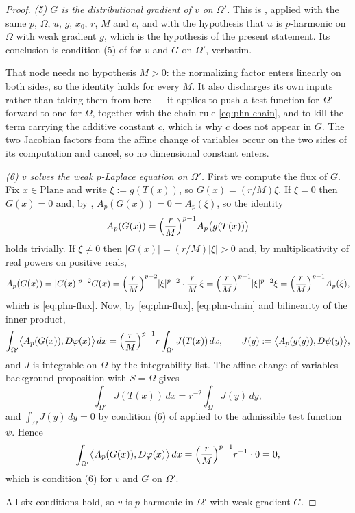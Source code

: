 \begin{proof}
\medskip\noindent\emph{(5) $G$ is the distributional gradient of $v$ on $\Omega'$.}
This is , applied with the same $p$, $\Omega$, $u$, $g$, $x_0$,
$r$, $M$ and $c$, and with the hypothesis that $u$ is $p$-harmonic on $\Omega$ with weak
gradient $g$, which is the hypothesis of the present statement.  Its conclusion is condition
(5) of  for $v$ and $G$ on $\Omega'$, verbatim.

That node needs no hypothesis $M>0$: the normalizing factor enters linearly on both sides, so
the identity holds for every $M$.  It also discharges its own inputs rather than taking them
from here --- it applies  to push a test function for
$\Omega'$ forward to one for $\Omega$, together with the chain rule \eqref{eq:phn-chain}, and
 to kill the term carrying the additive constant $c$,
which is why $c$ does not appear in $G$.  The two Jacobian factors from the affine change of
variables occur on the two sides of its computation and cancel, so no dimensional constant
enters.

\medskip\noindent\emph{(6) $v$ solves the weak $p$-Laplace equation on $\Omega'$.}
First we compute the flux of $G$.  Fix $x\in\mathrm{Plane}$ and write $\xi:=g(T(x))$, so
$G(x)=(r/M)\xi$.  If $\xi=0$ then $G(x)=0$ and, by , $A_p(G(x))=0=A_p(\xi)$,
so the identity
\begin{equation}\label{eq:phn-flux}
  A_p(G(x))=\Bigl(\frac rM\Bigr)^{p-1}A_p\bigl(g(T(x))\bigr)
\end{equation}
holds trivially.  If $\xi\neq0$ then $\lvert G(x)\rvert=(r/M)\lvert\xi\rvert>0$ and, by
multiplicativity of real powers on positive reals,
\[
  A_p(G(x))
  =\lvert G(x)\rvert^{p-2}G(x)
  =\Bigl(\frac rM\Bigr)^{p-2}\lvert\xi\rvert^{p-2}\cdot\frac rM\,\xi
  =\Bigl(\frac rM\Bigr)^{p-1}\lvert\xi\rvert^{p-2}\xi
  =\Bigl(\frac rM\Bigr)^{p-1}A_p(\xi),
\]
which is \eqref{eq:phn-flux}.  Now, by \eqref{eq:phn-flux}, \eqref{eq:phn-chain} and
bilinearity of the inner product,
\[
  \int_{\Omega'}\bigl\langle A_p(G(x)),D\varphi(x)\bigr\rangle\,dx
  =\Bigl(\frac rM\Bigr)^{p-1}r\int_{\Omega'}J(T(x))\,dx,
  \qquad J(y):=\bigl\langle A_p(g(y)),D\psi(y)\bigr\rangle ,
\]
and $J$ is integrable on $\Omega$ by the integrability list.  The affine change-of-variables
background proposition with $S=\Omega$ gives
\[
  \int_{\Omega'}J(T(x))\,dx=r^{-2}\int_\Omega J(y)\,dy ,
\]
and $\int_\Omega J(y)\,dy=0$ by condition (6) of  applied to the admissible
test function $\psi$.  Hence
\[
  \int_{\Omega'}\bigl\langle A_p(G(x)),D\varphi(x)\bigr\rangle\,dx
  =\Bigl(\frac rM\Bigr)^{p-1}r^{-1}\cdot0=0 ,
\]
which is condition (6) for $v$ and $G$ on $\Omega'$.

All six conditions hold, so $v$ is $p$-harmonic in $\Omega'$ with weak gradient $G$.
\end{proof}
